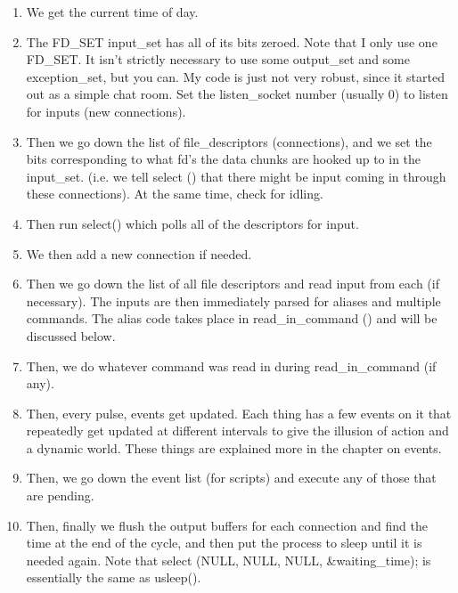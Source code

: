 \begin{enumerate}

\item  We get the current time of day.

\item The FD\_SET input\_set has all of its bits zeroed. Note that I
only use one FD\_SET. It isn't strictly necessary to use some
output\_set and some exception\_set, but you can. My code is just not
very robust, since it started out as a simple chat room. Set the
listen\_socket number (usually 0) to listen for inputs (new
connections).

\item Then we go down the list of file\_descriptors (connections), and
we set the bits corresponding to what fd's the data chunks are hooked
up to in the input\_set. (i.e. we tell select () that there might be
input coming in through these connections). At the same time, check
for idling.

\item Then run select() which polls all of the descriptors for input.

\item We then add a new connection if needed. 

\item Then we go down the list of all file descriptors and read input
from each (if necessary). The inputs are then immediately parsed for
aliases and multiple commands. The alias code takes place in
read\_in\_command () and will be discussed below.

\item Then, we do whatever command was read in during
read\_in\_command (if any).

\item Then, every pulse, events get updated. Each thing has a few
events on it that repeatedly get updated at different intervals to
give the illusion of action and a dynamic world. These things are
explained more in the chapter on events.

\item Then, we go down the event list (for scripts) and execute any of
those that are pending.

\item Then, finally we flush the output buffers for each connection
and find the time at the end of the cycle, and then put the process to
sleep until it is needed again. Note that select (NULL, NULL, NULL,
\&waiting\_time); is essentially the same as usleep().

\end{enumerate} 

